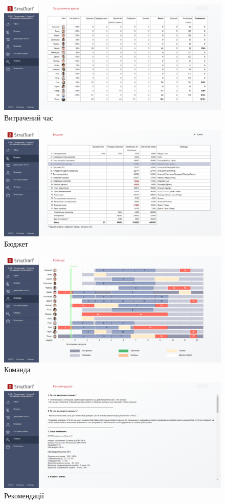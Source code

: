 \begin{figure}[h]
    \centering
        \includegraphics[width=\textwidth]{scr_time}
    \caption{Витрачений час}
\end{figure}

\begin{figure}[h]
    \centering
        \includegraphics[width=\textwidth]{scr_budget}
    \caption{Бюджет}
\end{figure}

\begin{figure}[h]
    \centering
        \includegraphics[width=\textwidth]{scr_team}
    \caption{Команда}
\end{figure}

\begin{figure}[h]
    \centering
        \includegraphics[width=\textwidth]{scr_recomendations}
    \caption{Рекомендації}
\end{figure}


